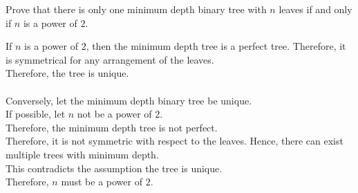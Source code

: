 \documentclass[fleqn, a4paper, 11pt, oneside]{amsart}
\theoremstyle{definition}
\theoremstyle{theorem}
\theoremstyle{remark}
\begin{document}
\begin{question}
	Prove that there is only one minimum depth binary tree with $n$ leaves if and only if $n$ is a power of $2$.
\end{question}

\begin{solution}
	If $n$ is a power of $2$, then the minimum depth tree is a perfect tree.
	Therefore, it is symmetrical for any arrangement of the leaves.\\
	Therefore, the tree is unique.\\
	~\\
	Conversely, let the minimum depth binary tree be unique.\\
	If possible, let $n$ not be a power of $2$.\\
	Therefore, the minimum depth tree is not perfect.\\
	Therefore, it is not symmetric with respect to the leaves.
	Hence, there can exist multiple trees with minimum depth.\\
	This contradicts the assumption the tree is unique.\\
	Therefore, $n$ must be a power of $2$.
\end{solution}
\end{document}
